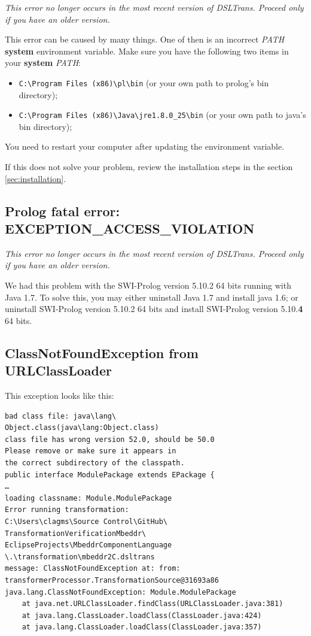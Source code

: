 \emph{This error no longer occurs in the most recent version of DSLTrans.
Proceed only if you have an older version.
}

This error can be caused by many things. One of then is an incorrect \emph{PATH} \textbf{system} environment variable.
Make sure you have the following two items in your \textbf{system} \emph{PATH}:
\begin{itemize}
	\item \verb=C:\Program Files (x86)\pl\bin= (or your own path to prolog's bin
	directory);
	\item \verb=C:\Program Files (x86)\Java\jre1.8.0_25\bin= (or your own path
	to java's bin directory);
\end{itemize}

You need to restart your computer after updating the environment variable.

If this does not solve your problem, review the installation steps in the section \ref{sec:installation}.

\subsection{Prolog fatal error: EXCEPTION\_ACCESS\_VIOLATION}


\emph{This error no longer occurs in the most recent version of DSLTrans.
Proceed only if you have an older version.
}

We had this problem with the SWI-Prolog version 5.10.2 64 bits running with Java 1.7.
To solve this, you may either uninstall Java 1.7 and install java 1.6; 
or uninstall SWI-Prolog version 5.10.2 64 bits and install SWI-Prolog version 5.10.\textbf{4} 64 bits.


\subsection{ClassNotFoundException from URLClassLoader}

This exception looks like this:
\begin{verbatim}
bad class file: java\lang\
Object.class(java\lang:Object.class)
class file has wrong version 52.0, should be 50.0
Please remove or make sure it appears in 
the correct subdirectory of the classpath.
public interface ModulePackage extends EPackage {
…
loading classname: Module.ModulePackage
Error running transformation: 
C:\Users\clagms\Source Control\GitHub\
TransformationVerificationMbeddr\
EclipseProjects\MbeddrComponentLanguage
\.\transformation\mbeddr2C.dsltrans
message: ClassNotFoundException at: from: 
transformerProcessor.TransformationSource@31693a86
java.lang.ClassNotFoundException: Module.ModulePackage
	at java.net.URLClassLoader.findClass(URLClassLoader.java:381)
	at java.lang.ClassLoader.loadClass(ClassLoader.java:424)
	at java.lang.ClassLoader.loadClass(ClassLoader.java:357)
\end{verbatim}

